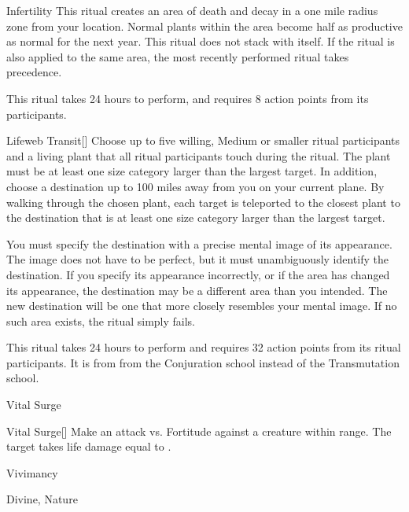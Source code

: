 \lowercase{\hypertarget{spell:Infertility}{}}\label{spell:Infertility}
\begin{ability}[\nth{2}]{\hypertarget{spell:Infertility}{Infertility}}
This ritual creates an area of death and decay in a one mile radius zone from your location.
Normal plants within the area become half as productive as normal for the next year.
This ritual does not stack with itself.
If the  ritual is also applied to the same area, the most recently performed ritual takes precedence.

This ritual takes 24 hours to perform, and requires 8 action points from its participants.
\end{ability}
\vspace{0.25em}



\lowercase{\hypertarget{spell:Lifeweb Transit}{}}\label{spell:Lifeweb Transit}
\begin{ability}[\nth{4}]{\hypertarget{spell:Lifeweb Transit}{Lifeweb Transit}}[]
Choose up to five willing, Medium or smaller ritual participants and a living plant that all ritual participants touch during the ritual.
The plant must be at least one size category larger than the largest target.
In addition, choose a destination up to 100 miles away from you on your current plane.
By walking through the chosen plant, each target is teleported to the closest plant to the destination that is at least one size category larger than the largest target.

You must specify the destination with a precise mental image of its appearance.
The image does not have to be perfect, but it must unambiguously identify the destination.
If you specify its appearance incorrectly, or if the area has changed its appearance, the destination may be a different area than you intended.
The new destination will be one that more closely resembles your mental image.
If no such area exists, the ritual simply fails.

This ritual takes 24 hours to perform and requires 32 action points from its ritual participants.
It is from from the Conjuration school instead of the Transmutation school.
\end{ability}
\vspace{0.25em}


\newpage
\begin{spellsection}{Vital Surge}


\begin{ability}{Vital Surge}[]
Make an attack vs. Fortitude against a creature within \rngmed range.
\hit The target takes life damage equal to .
\end{ability}




 Vivimancy

 Divine, Nature
\end{spellsection}


